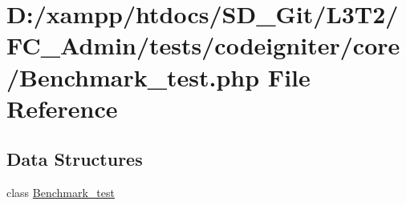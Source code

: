 \hypertarget{_admin_2tests_2codeigniter_2core_2_benchmark__test_8php}{}\section{D\+:/xampp/htdocs/\+S\+D\+\_\+\+Git/\+L3\+T2/\+F\+C\+\_\+\+Admin/tests/codeigniter/core/\+Benchmark\+\_\+test.php File Reference}
\label{_admin_2tests_2codeigniter_2core_2_benchmark__test_8php}
\subsection*{Data Structures}
\begin{DoxyCompactItemize}
\item 
class \hyperlink{class_benchmark__test}{Benchmark\+\_\+test}
\end{DoxyCompactItemize}
